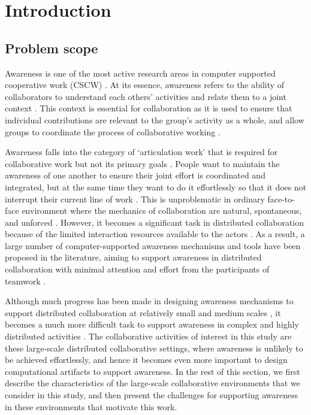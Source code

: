 \graphicspath{{Figures/}}

\chapter{Introduction} 
\label{chapter1:introduction}

\section{Problem scope}
\label{sec:problem_scope}
Awareness is one of the most active research areas in computer supported cooperative work (CSCW) \cite{dourish1992awareness,schmidt2002a,rittenbruch2009a}. At its essence, awareness refers to the ability of collaborators to understand each others' activities and relate them to a joint context \cite{rittenbruch2009a}. This context is essential for collaboration as it is used to ensure that individual contributions are relevant to the group’s activity as a whole, and allow groups to coordinate the process of collaborative working \cite{dourish1992awareness}. 

Awareness falls into the category of `articulation work' that is required for collaborative work but not its primary goals \cite{schmidt1992taking}. People want to maintain the awareness of one another to ensure their joint effort is coordinated and integrated, but at the same time they want to do it effortlessly so that it does not interrupt their current line of work \cite{fussell1998coordination}. This is unproblematic in ordinary face-to-face environment where the mechanics of collaboration are natural, spontaneous, and unforced \cite{Gutwin2002}. However, it becomes a significant task in distributed collaboration because of the limited interaction resources available to the actors \cite{carroll2003a}. As a result, a large number of computer-supported awareness mechanisms and tools have been proposed in the literature, aiming to support awareness in distributed collaboration with minimal attention and effort from the participants of teamwork \cite{rittenbruch2009a,markopoulos2009design}.

Although much progress has been made in designing awareness mechanisms to support distributed collaboration at relatively small and medium scales \cite{antunes2010a}, it becomes a much more difficult task to support awareness in complex and highly distributed activities \cite{cabitza2009promoting}. The collaborative activities of interest in this study are these large-scale distributed collaborative settings, where awareness is unlikely to be achieved effortlessly, and hence it becomes even more important to design computational artifacts to support awareness. In the rest of this section, we first describe the characteristics of the large-scale collaborative environments that we consider in this study, and then present the challenges for supporting awareness in these environments that motivate this work.


